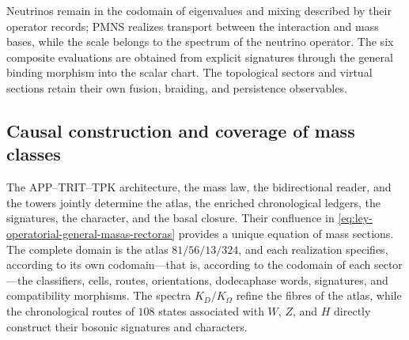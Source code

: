 

Neutrinos remain in the codomain of eigenvalues and mixing described by their operator records; PMNS realizes transport between the interaction and mass bases, while the scale belongs to the spectrum of the neutrino operator. The six composite evaluations are obtained from explicit signatures through the general binding morphism into the scalar chart. The topological sectors and virtual sections retain their own fusion, braiding, and persistence observables.

\subsection{Causal construction and coverage of mass classes}

The APP--TRIT--TPK architecture, the mass law, the bidirectional reader, and the towers jointly determine the atlas, the enriched chronological ledgers, the signatures, the character, and the basal closure. Their confluence in \eqref{eq:ley-operatorial-general-masas-rectoras} provides a unique equation of mass sections. The complete domain is the atlas \(81/56/13/324\), and each realization specifies, according to its own codomain---that is, according to the codomain of each sector---the classifiers, cells, routes, orientations, dodecaphase words, signatures, and compatibility morphisms. The spectra \(K_D/K_\Omega\) refine the fibres of the atlas, while the chronological routes of \(108\) states associated with \(W\), \(Z\), and \(H\) directly construct their bosonic signatures and characters.
